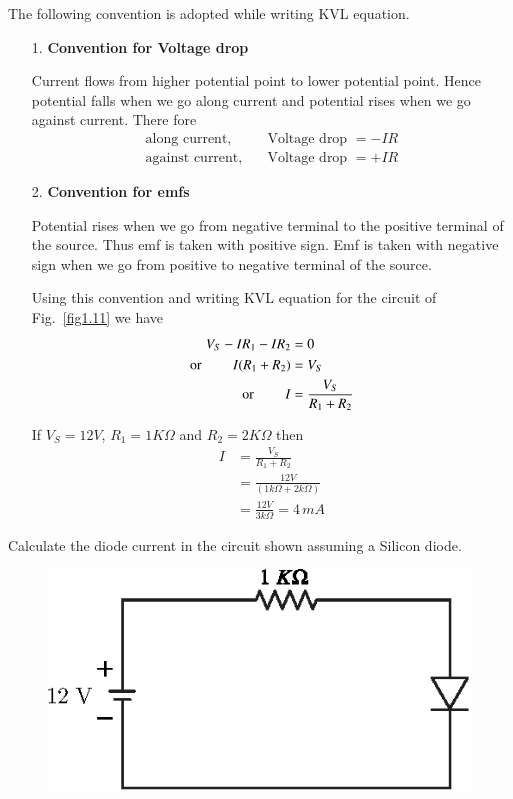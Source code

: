 The following convention is adopted while writing KVL equation. 

\begin{itemize}
\item[{\rm 1.}] \textbf{Convention for Voltage drop}

Current flows from higher potential point to lower potential
point. Hence potential falls when we go along current and potential
rises when we go against current. There fore
\begin{align*}
\text{along current, } \quad & \text{Voltage drop } = - IR\\
\text{against current,} \quad & \text{Voltage drop } = + IR  
\end{align*}

\item[{\rm 2.}] \textbf{Convention for emfs}

Potential rises when we go from negative terminal to the positive
terminal of the source. Thus emf is taken with positive sign. Emf is
taken with negative  sign when we go from positive to negative
terminal of the source.

Using this convention and writing KVL equation for the circuit of
Fig.~\ref{fig1.11} we have
\begin{align}
V_S - IR_1 - I R_2 & = 0 \notag\\
\text{or } \qquad I (R_1 + R_2) & = V_S  \notag\\
\text{or } \qquad  I & = \frac{V_S}{R_1 + R_2}  \label{eq1.5}
\end{align}

If $V_{S}=12V$, $R_1 = 1 K \Omega$ and $R_2 = 2 K \Omega$ then
\begin{align*}
I &= \frac{V_S}{R_1 + R_2}\\[5pt]
& = \frac{12 V}{(1k \Omega+2k\Omega)}\\[5pt]
& = \frac{12 V}{3
k \Omega} = 4\, m A
\end{align*}
\end{itemize}
 
\begin{example}\label{exam1.8}
Calculate the diode current in the circuit shown assuming a Silicon diode.
\begin{figure}[H]
\centering
\includegraphics{chap1/S3-EE-01-019.eps}
\end{figure}
\end{example}

